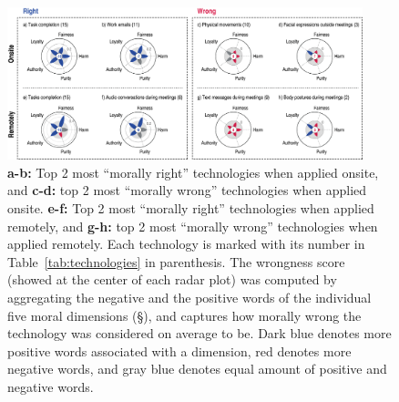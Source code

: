 \begin{figure}
    \centering
    \includegraphics[width=0.92\textwidth]{figures/graphic_v4.png}
    \caption{\textbf{a-b:} Top 2 most ``morally right'' technologies when applied onsite, and \textbf{c-d:} top 2 most ``morally wrong'' technologies when applied onsite. \textbf{e-f:} Top 2 most ``morally right'' technologies when applied remotely, and \textbf{g-h:} top 2 most ``morally wrong'' technologies when applied remotely. Each technology is marked with its number in Table~\ref{tab:technologies} in parenthesis. The wrongness score (showed at the center of each radar plot) was computed by aggregating the negative and the positive words of the individual five moral dimensions (\S{}), and captures how morally wrong the technology was considered on average to be. Dark blue denotes more positive words associated with a dimension, red denotes more negative words, and gray blue denotes equal amount of positive and negative words.}
    \label{fig:radar_plots}
\end{figure}

